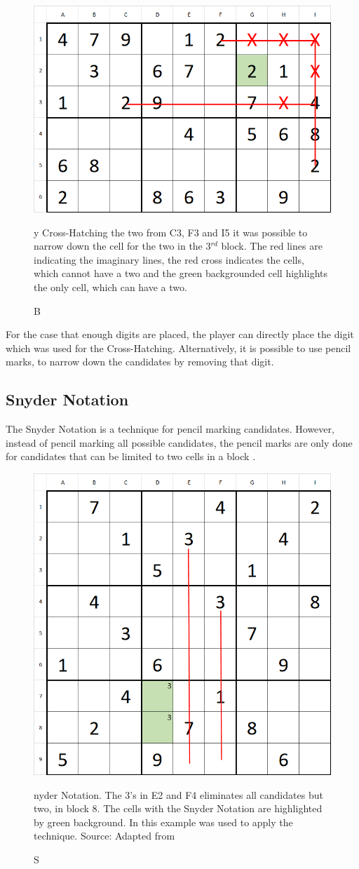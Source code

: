 \documentclass[twoside]{ausarbeitung}
\begin{document}
\begin{figure}[H]
  \centering
  \includegraphics[width=.5\linewidth]{images/xhatching}
  \caption[Cross-Hatching] By Cross-Hatching the two from C3, F3 and I5 it was possible to narrow down the cell for the two in the 3$^{rd}$ block. The red lines are indicating the imaginary lines, the red cross indicates the cells, which cannot have a two and the green backgrounded cell highlights the only cell, which can have a two.
  \label{fig:xhatching}
\end{figure}%

For the case that enough digits are placed, the player can directly place the digit which was used for the Cross-Hatching. Alternatively, it is possible to use pencil marks, to narrow down the candidates by removing that digit.

\subsection{Snyder Notation} \label{ss:snydernot}
The Snyder Notation is a technique for pencil marking candidates. However, instead of pencil marking all possible candidates, the pencil marks are only done for candidates that can be limited to two cells in a block \cite{ExpertSu16:online}. 

\begin{figure}[H]
  \centering
  \includegraphics[width=.5\linewidth]{images/snyder}
  \caption[Snyder Notation]Snyder Notation. The 3's in E2 and F4 eliminates all candidates but two, in block 8. The cells with the Snyder Notation are highlighted by green background. In this example  was used to apply the technique. Source: Adapted from \cite{ExpertSu16:online}
  \label{fig:snyder}
\end{figure}%
\end{document}
